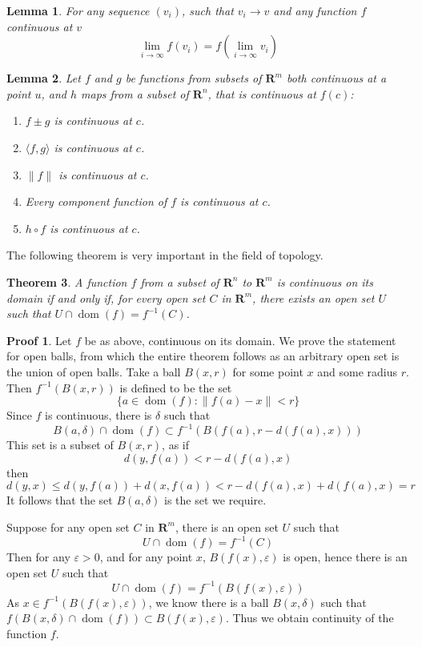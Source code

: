 \documentclass[12pt]{amsbook}
\theoremstyle{plain}
\newtheorem{theorem}{Theorem}
\newtheorem{lemma}[theorem]{Lemma}
\theoremstyle{definition}
\newtheorem*{prf}{Proof}
\DeclareMathOperator{\dom}{dom}
\begin{document}
\begin{lemma}
  For any sequence $(v_i)$, such that $v_i \to v$ and any function $f$ continuous at $v$
  \[ \lim_{i \to \infty} f(v_i) = f(\lim_{i \to \infty} v_i) \]
\end{lemma}

\begin{lemma}
  Let $f$ and $g$ be functions from subsets of $\mathbf{R}^m$ both continuous at a point $u$, and $h$ maps from a subset of $\mathbf{R}^n$, that is continuous at $f(c)$:

  \begin{enumerate}
    \item $f \pm g$ is continuous at $c$.
    \item $\langle f, g \rangle$ is continuous at $c$.
    \item $\|f\|$ is continuous at $c$.
    \item Every component function of $f$ is continuous at $c$.
    \item $h \circ f$ is continuous at $c$.
  \end{enumerate}
\end{lemma}

The following theorem is very important in the field of topology.

\begin{theorem}
  A function $f$ from a subset of $\mathbf{R}^n$ to $\mathbf{R}^m$ is continuous on its domain if and only if, for every open set $C$ in $\mathbf{R}^m$, there exists an open set $U$ such that $U \cap \dom(f) = f^{-1}(C)$.
\end{theorem}
\begin{prf}
  Let $f$ be as above, continuous on its domain. We prove the statement for open balls, from which the entire theorem follows as an arbitrary open set is the union of open balls. Take a ball $B(x,r)$ for some point $x$ and some radius $r$. Then $f^{-1}(B(x,r))$ is defined to be the set
  \[ \{ a \in \dom(f) : \| f(a) - x \| < r \} \]
  Since $f$ is continuous, there is $\delta$ such that
  \[ B(a,\delta) \cap \dom(f) \subset f^{-1}(B(f(a),r - d(f(a), x))) \]
  This set is a subset of $B(x,r)$, as if
  \[ d(y, f(a)) < r - d(f(a), x) \]
  then
  \[ d(y, x) \leq d(y, f(a)) + d(x, f(a)) < r - d(f(a), x) + d(f(a), x) = r \]
  It follows that the set $B(a,\delta)$ is the set we require.

  Suppose for any open set $C$ in $\mathbf{R}^m$, there is an open set $U$ such that
  \[ U \cap \dom(f) = f^{-1}(C) \]
  Then for any $\varepsilon > 0$, and for any point $x$, $B(f(x), \varepsilon)$ is open, hence there is an open set $U$ such that
  \[ U \cap \dom(f) = f^{-1}(B(f(x), \varepsilon)) \]
  As $x \in f^{-1}(B(f(x), \varepsilon))$, we know there is a ball $B(x, \delta)$ such that $f(B(x, \delta) \cap \dom(f)) \subset B(f(x), \varepsilon)$. Thus we obtain continuity of the function $f$.
\end{prf}
\end{document}
